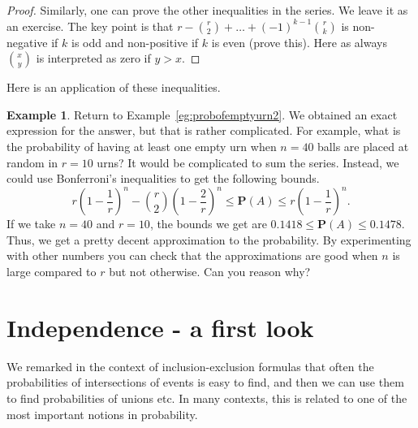 \documentclass[preprint,  11pt]{amsart}
\theoremstyle{plain} %
\theoremstyle{definition} %
\newtheorem{example}[theorem]{Example}
\begin{document}
{{{{{{{{{{{{{\begin{proof}
Similarly, one can prove the other inequalities in the series. We leave it as an exercise. The key point is that $r-\binom{r}{2}+\ldots +(-1)^{k-1}\binom{r}{k}$ is non-negative if $k$ is odd and non-positive if $k$ is even (prove this). Here as always $\binom{x}{y}$ is interpreted as zero if $y>x$.
\end{proof}
Here is an application of these inequalities.
\begin{example} Return to Example~\ref{eg:probofemptyurn2}. We obtained an exact expression for the answer, but that is rather complicated. For example, what is the probability of having at least one empty urn when $n=40$ balls are placed at random in $r=10$ urns? It would be complicated to sum the series. Instead, we could use Bonferroni's inequalities to get the following bounds.
$$
 r\left(1-\frac{1}{r}\right)^{n}-\binom{r}{2}\left(1-\frac{2}{r}\right)^{n}\le \mathbf{P}(A) \le r\left(1-\frac{1}{r}\right)^{n}.
$$
If we take $n=40$ and $r=10$, the bounds we get are $0.1418\le \mathbf{P}(A)\le 0.1478$. Thus, we get a pretty decent approximation to the probability. By experimenting with other numbers you can check that the approximations are good when $n$ is large compared to $r$ but not otherwise. Can you reason why?
\end{example}




\section{Independence - a first look}
We remarked in the context of inclusion-exclusion formulas that often the probabilities of intersections of events is easy to find, and then we can use them to find probabilities of unions etc. In many contexts, this is related to one of the most important notions in probability.

}}}}}}}}}}}}}
\end{document}
